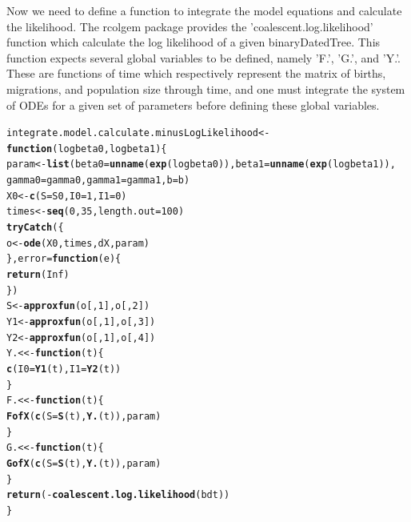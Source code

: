 \documentclass[english]{article}\usepackage[]{graphicx}\usepackage[]{color}
\makeatletter
\newcommand{\hlnum}[1]{\textcolor[rgb]{0.686,0.059,0.569}{#1}}%
\newcommand{\hlopt}[1]{\textcolor[rgb]{0,0,0}{#1}}%
\newcommand{\hlstd}[1]{\textcolor[rgb]{0.345,0.345,0.345}{#1}}%
\newcommand{\hlkwa}[1]{\textcolor[rgb]{0.161,0.373,0.58}{\textbf{#1}}}%
\newcommand{\hlkwb}[1]{\textcolor[rgb]{0.69,0.353,0.396}{#1}}%
\newcommand{\hlkwc}[1]{\textcolor[rgb]{0.333,0.667,0.333}{#1}}%
\newcommand{\hlkwd}[1]{\textcolor[rgb]{0.737,0.353,0.396}{\textbf{#1}}}%
\newenvironment{kframe}{%
 \def\at@end@of@kframe{}%
 \ifinner\ifhmode%
  \def\at@end@of@kframe{\end{minipage}}%
  \begin{minipage}{\columnwidth}%
 \fi\fi%
 \def\FrameCommand##1{\hskip\@totalleftmargin \hskip-\fboxsep
 \colorbox{shadecolor}{##1}\hskip-\fboxsep
     \hskip-\linewidth \hskip-\@totalleftmargin \hskip\columnwidth}%
 \MakeFramed {\advance\hsize-\width
   \@totalleftmargin\z@ \linewidth\hsize
   \@setminipage}}%
 {\par\unskip\endMakeFramed%
 \at@end@of@kframe}
\newenvironment{knitrout}{}{} %
\makeatother
\begin{document}
Now we need to define a function to integrate the model equations
and calculate the likelihood. The rcolgem package provides the 'coalescent.log.likelihood'
function which calculate the log likelihood of a given binaryDatedTree.
This function expects several global variables to be defined, namely
'F.', 'G.', and 'Y.'. These are functions of time which respectively
represent the matrix of births, migrations, and population size through
time, and one must integrate the system of ODEs for a given set of
parameters before defining these global variables. 

\begin{knitrout}
\color{fgcolor}\begin{kframe}
\begin{alltt}
\hlstd{integrate.model.calculate.minusLogLikelihood} \hlkwb{<-} \hlkwa{function}\hlstd{(}\hlkwc{logbeta0}\hlstd{,} \hlkwc{logbeta1}\hlstd{) \{}
    \hlstd{param} \hlkwb{<-} \hlkwd{list}\hlstd{(}\hlkwc{beta0} \hlstd{=} \hlkwd{unname}\hlstd{(}\hlkwd{exp}\hlstd{(logbeta0)),} \hlkwc{beta1} \hlstd{=} \hlkwd{unname}\hlstd{(}\hlkwd{exp}\hlstd{(logbeta1)),}
        \hlkwc{gamma0} \hlstd{= gamma0,} \hlkwc{gamma1} \hlstd{= gamma1,} \hlkwc{b} \hlstd{= b)}
    \hlstd{X0} \hlkwb{<-} \hlkwd{c}\hlstd{(}\hlkwc{S} \hlstd{= S0,} \hlkwc{I0} \hlstd{=} \hlnum{1}\hlstd{,} \hlkwc{I1} \hlstd{=} \hlnum{0}\hlstd{)}
    \hlstd{times} \hlkwb{<-} \hlkwd{seq}\hlstd{(}\hlnum{0}\hlstd{,} \hlnum{35}\hlstd{,} \hlkwc{length.out} \hlstd{=} \hlnum{100}\hlstd{)}
    \hlkwd{tryCatch}\hlstd{(\{}
        \hlstd{o} \hlkwb{<-} \hlkwd{ode}\hlstd{(X0, times, dX, param)}
    \hlstd{\},} \hlkwc{error} \hlstd{=} \hlkwa{function}\hlstd{(}\hlkwc{e}\hlstd{) \{}
        \hlkwd{return}\hlstd{(}\hlnum{Inf}\hlstd{)}
    \hlstd{\})}
    \hlstd{S} \hlkwb{<-} \hlkwd{approxfun}\hlstd{(o[,} \hlnum{1}\hlstd{], o[,} \hlnum{2}\hlstd{])}
    \hlstd{Y1} \hlkwb{<-} \hlkwd{approxfun}\hlstd{(o[,} \hlnum{1}\hlstd{], o[,} \hlnum{3}\hlstd{])}
    \hlstd{Y2} \hlkwb{<-} \hlkwd{approxfun}\hlstd{(o[,} \hlnum{1}\hlstd{], o[,} \hlnum{4}\hlstd{])}
    \hlstd{Y.} \hlkwb{<<-} \hlkwa{function}\hlstd{(}\hlkwc{t}\hlstd{) \{}
        \hlkwd{c}\hlstd{(}\hlkwc{I0} \hlstd{=} \hlkwd{Y1}\hlstd{(t),} \hlkwc{I1} \hlstd{=} \hlkwd{Y2}\hlstd{(t))}
    \hlstd{\}}
    \hlstd{F.} \hlkwb{<<-} \hlkwa{function}\hlstd{(}\hlkwc{t}\hlstd{) \{}
        \hlkwd{FofX}\hlstd{(}\hlkwd{c}\hlstd{(}\hlkwc{S} \hlstd{=} \hlkwd{S}\hlstd{(t),} \hlkwd{Y.}\hlstd{(t)), param)}
    \hlstd{\}}
    \hlstd{G.} \hlkwb{<<-} \hlkwa{function}\hlstd{(}\hlkwc{t}\hlstd{) \{}
        \hlkwd{GofX}\hlstd{(}\hlkwd{c}\hlstd{(}\hlkwc{S} \hlstd{=} \hlkwd{S}\hlstd{(t),} \hlkwd{Y.}\hlstd{(t)), param)}
    \hlstd{\}}
    \hlkwd{return}\hlstd{(}\hlopt{-}\hlkwd{coalescent.log.likelihood}\hlstd{(bdt))}
\hlstd{\}}
\end{alltt}
\end{kframe}
\end{knitrout}
\end{document}
